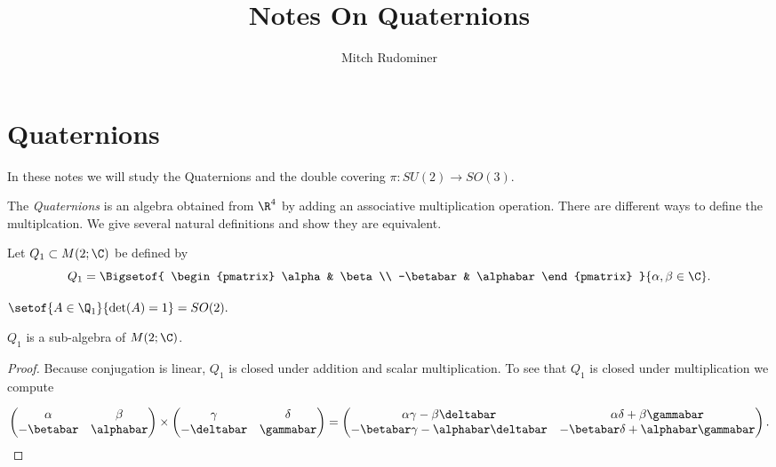 \documentclass[oneside,12pt]{amsart}
\begin{document}
\title{Notes On Quaternions}
\author{Mitch Rudominer}

\maketitle

\tableofcontents


\section{Quaternions}
In these notes we will study the Quaternions and the double covering $\pi:SU(2)\to SO(3)$.

The \emph{Quaternions} is an algebra obtained from $\R^4$ by adding an associative multiplication operation. There are different ways to define the multiplcation. We give several natural definitions and show they are equivalent.

Let $Q_1 \subset M(2; \C)$ be defined by 
$$
Q_1 = \Bigsetof{ \begin{pmatrix}
\alpha & \beta \\
-\betabar & \alphabar
\end{pmatrix} 
}{\alpha,\beta \in \C}.
$$

\begin{note}
$\setof{A\in\Q_1}{\det(A) = 1} = SO(2).$
\end{note}


\begin{lemma} $Q_1$  is a sub-algebra of $M(2; \C)$.
\end{lemma}
\begin{proof}
Because conjugation is linear, $Q_1$ is closed under addition and scalar multiplication.
To see that $Q_1$ is closed under multiplication we compute 

$$
\begin{pmatrix}
\alpha & \beta \\
-\betabar & \alphabar
\end{pmatrix}
\times
\begin{pmatrix}
\gamma & \delta \\
-\deltabar & \gammabar
\end{pmatrix} 
= 
\begin{pmatrix}
\alpha\gamma - \beta\deltabar & \alpha\delta + \beta\gammabar \\
-\betabar\gamma -\alphabar\deltabar & -\betabar\delta + \alphabar\gammabar
\end{pmatrix} .
$$
\end{proof}
\end{document}
